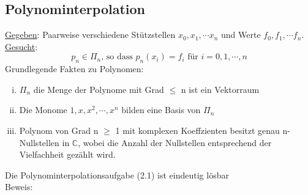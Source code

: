 \subsection{Polynominterpolation}
\underline{Gegeben}: Paarweise verschiedene Stützstellen $x_0, x_1, \cdots x_n$ und
Werte $f_0, f_1, \cdots f_n$.\\
\underline{Gesucht}:
\begin{equation*}
  \tag{2.1} p_n \in  \Pi_n \text{, so dass } p_n(x_i) = 
  f_i \text{ für } i = 0, 1, \cdots ,n
\end{equation*}
Grundlegende Fakten zu Polynomen:
\begin{enumerate}[(i)]
  \item $\Pi_n$ die Menge der Polynome mit Grad $\leq$ n ist ein Vektorraum
  \item Die Monome $1, x, x^2, \cdots, x^n$ bilden eine Basis von $\Pi_n$
  \item Polynom von Grad n $\geq$ 1 mit komplexen Koeffzienten besitzt genau n-Nullstellen
    in $\mathbb{C}$, wobei die Anzahl der Nullstellen entsprechend der Vielfachheit
    gezählt wird.
\end{enumerate}
 Die Polynominterpolationsaufgabe (2.1) ist eindeutig lösbar\\
Beweis:
